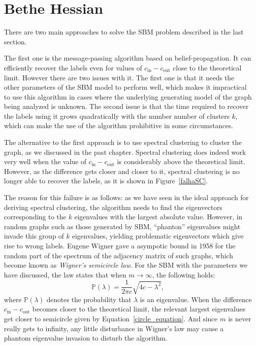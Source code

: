 \section{Bethe Hessian}
There are two main approaches to solve the SBM problem described in the last section. 

The first one is the message-passing algorithm based on belief-propagation.
It can efficiently recover the labels even for values of $c_\text{in} - c_\text{out}$ close to the theoretical limit.
However there are two issues with it.
The first one is that it needs the other parameters of the SBM model to perform well, which makes it impractical to use this algorithm in cases where the underlying generating model of the graph being analyzed is unknown.
The second issue is that the time required to recover the labels using it grows quadratically with the number number of clusters $k$, which can make the use of the algorithm prohibitive in some circumstances.

The alternative to the first approach is to use spectral clustering to cluster the graph, as we discussed in the past chapter.
Spectral clustering does indeed work very well when the value of $c_\text{in} - c_\text{out}$ is considerably above the theoretical limit.
However, as the difference gets closer and closer to it, spectral clustering is no longer able to recover the labels, as it is shown in Figure~\vref{falhaSC}.


The reason for this failure is as follows: as we have seen in the ideal approach for deriving spectral clustering, the algorithm needs to find the eigenvectors corresponding to the $k$ eigenvalues with the largest absolute value.
However, in random graphs such as those generated by SBM, ``phanton'' eigenvalues might invade this group of $k$ eigenvalues, yielding problematic eigenvectors which give rise to wrong labels.
Eugene Wigner gave a asympotic bound in 1958 \cite{circle} for the random part of the spectrum of the adjacency matrix of such graphs, which become known as \textit{Wigner's semicircle law}. 
For the SBM with the parameters we have discussed, the law states that when $m \rightarrow \infty$, the following holds:
\begin{equation} \label{circle_equation}
   \mathbb P (\lambda) = \frac{1}{2 \pi c} \sqrt{4c - \lambda^2},
\end{equation}
where $\mathbb P (\lambda)$ denotes the probability that $\lambda$ is an eigenvalue.
When the difference $c_\text{in} - c_\text{out}$ becomes closer to the theoretical limit, the relevant largest eigenvalues get closer to semicircle given by Equation~\vref{circle_equation}.
And since $m$ is never really gets to infinity, any little disturbance in Wigner's law may cause a phantom eigenvalue invasion to disturb the algorithm.

